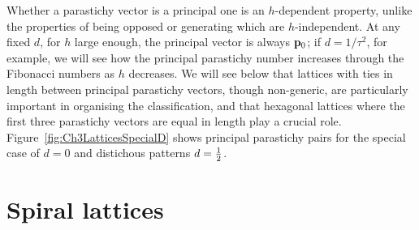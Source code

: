 Whether a parastichy vector is a principal one is an $h$-dependent property, unlike the properties of being opposed or generating which are $h$-independent. At any fixed $d$, for $h$ large enough, the principal vector is always ${\mathbf p}_{0}$; if $d=1/\tau^2$, for example, we will see  how the principal parastichy number increases through the Fibonacci numbers as $h$ decreases. We will see below that lattices with ties in length between principal parastichy vectors, though non-generic, are particularly important in organising the classification, and that hexagonal lattices where the first three parastichy vectors are equal in length play a crucial role. 
Figure~\ref{fig:Ch3LatticesSpecialD} shows principal parastichy pairs for the special case of  $d=0$ and distichous patterns $d=\textstyle{\frac{1}{2}}$.  
\section{Spiral lattices}
\label{sec:spiral}

